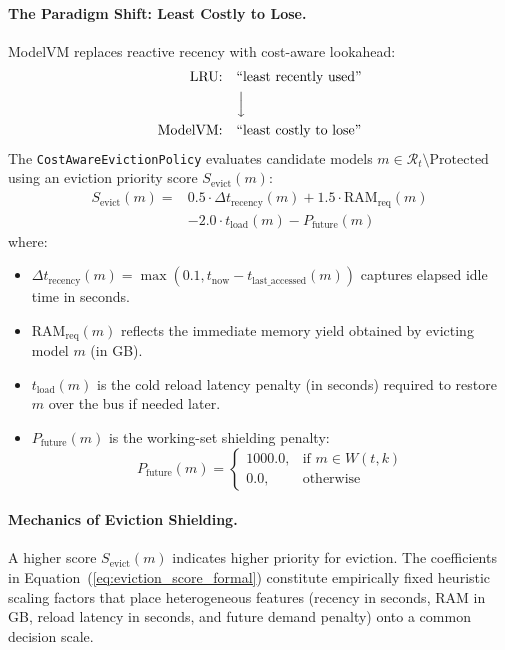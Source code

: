 \paragraph{The Paradigm Shift: Least Costly to Lose.}
ModelVM replaces reactive recency with cost-aware lookahead:
\begin{equation}
\begin{aligned}
\text{LRU:} &\quad \text{``least recently used''} \\
&\quad\Big\downarrow \\
\text{ModelVM:} &\quad \text{``least costly to lose''}
\end{aligned}
\end{equation}
The \texttt{CostAwareEvictionPolicy} evaluates candidate models $m \in \mathcal{R}_t \setminus \text{Protected}$ using an eviction priority score $S_{\text{evict}}(m)$:
\begin{equation}
\begin{aligned}
S_{\text{evict}}(m) = &0.5 \cdot \Delta t_{\text{recency}}(m) + 1.5 \cdot \text{RAM}_{\text{req}}(m) \\
&- 2.0 \cdot t_{\text{load}}(m) - P_{\text{future}}(m)
\end{aligned}
\label{eq:eviction_score_formal}
\end{equation}
where:
\begin{itemize}
    \item $\Delta t_{\text{recency}}(m) = \max(0.1, t_{\text{now}} - t_{\text{last\_accessed}}(m))$ captures elapsed idle time in seconds.
    \item $\text{RAM}_{\text{req}}(m)$ reflects the immediate memory yield obtained by evicting model $m$ (in GB).
    \item $t_{\text{load}}(m)$ is the cold reload latency penalty (in seconds) required to restore $m$ over the bus if needed later.
    \item $P_{\text{future}}(m)$ is the working-set shielding penalty:
    \begin{equation}
    P_{\text{future}}(m) = \begin{cases} 1000.0, & \text{if } m \in W(t, k) \\ 0.0, & \text{otherwise} \end{cases}
    \label{eq:shielding_penalty}
    \end{equation}
\end{itemize}

\paragraph{Mechanics of Eviction Shielding.}
A higher score $S_{\text{evict}}(m)$ indicates higher priority for eviction. The coefficients in Equation~(\ref{eq:eviction_score_formal}) constitute empirically fixed heuristic scaling factors that place heterogeneous features (recency in seconds, RAM in GB, reload latency in seconds, and future demand penalty) onto a common decision scale. 

